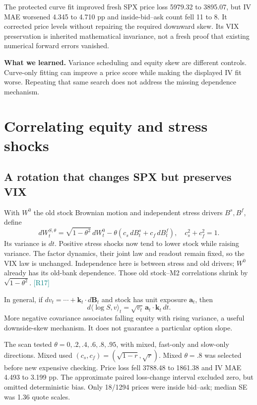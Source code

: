 \documentclass[11pt,a4paper]{article}
\newcommand{\src}[1]{\textcolor{teal}{\small[#1]}}
\newcommand{\lesson}[1]{\par\smallskip\noindent\colorbox{teal!9}{\parbox{\dimexpr\linewidth-2\fboxsep}{\textbf{What we learned.} #1}}\par\smallskip}
\begin{document}
The protected curve fit improved fresh SPX price loss 5979.32 to 3895.07, but IV MAE worsened 4.345 to 4.710 pp and inside-bid--ask count fell 11 to 8. It corrected price levels without repairing the required downward skew. Its VIX preservation is inherited mathematical invariance, not a fresh proof that existing numerical forward errors vanished.

\lesson{Variance scheduling and equity skew are different controls. Curve-only fitting can improve a price score while making the displayed IV fit worse. Repeating that same search does not address the missing dependence mechanism.}

\section{Correlating equity and stress shocks}
\subsection{A rotation that changes SPX but preserves VIX}
With $W^0$ the old stock Brownian motion and independent stress drivers $B^s,B^f$, define
\begin{equation}\label{eq:rotation}
dW_t^{S,\theta}=\sqrt{1-\theta^2}\,dW_t^0
-\theta(c_s\,dB_t^s+c_f\,dB_t^f),\quad c_s^2+c_f^2=1.
\end{equation}
Its variance is $dt$. Positive stress shocks now tend to lower stock while raising variance. The factor dynamics, their joint law and readout remain fixed, so the VIX law is unchanged. Independence here is between stress and old drivers; $W^0$ already has its old-bank dependence. Those old stock--M2 correlations shrink by $\sqrt{1-\theta^2}$. \src{R17}

In general, if $dv_t=\cdots+\mathbf k_t\cdot d\mathbf B_t$ and stock has unit exposure $\mathbf a_t$, then
\begin{equation}
d\langle\log S,v\rangle_t=\sqrt{v_t}\,\mathbf a_t\cdot\mathbf k_t\,dt.
\end{equation}
More negative covariance associates falling equity with rising variance, a useful downside-skew mechanism. It does not guarantee a particular option slope.

The scan tested $\theta=0,.2,.4,.6,.8,.95$, with mixed, fast-only and slow-only directions. Mixed used $(c_s,c_f)=(\sqrt{1-r},\sqrt r)$. Mixed $\theta=.8$ was selected before new expensive checking. Price loss fell 3788.48 to 1861.38 and IV MAE 4.493 to 3.199 pp. The approximate paired loss-change interval excluded zero, but omitted deterministic bias. Only 18/1294 prices were inside bid--ask; median SE was 1.36 quote scales.
\end{document}
